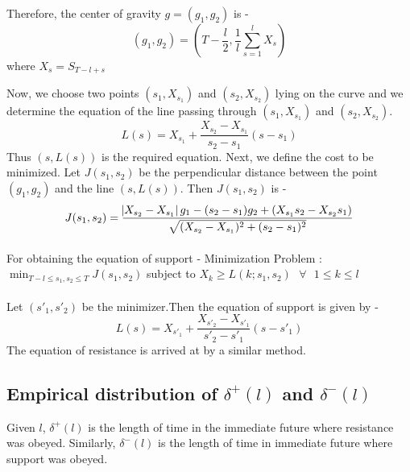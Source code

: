 \documentclass[a4paper]{article}
\numberwithin{equation}{subsection}
\begin{document}
Therefore, the center of gravity $g = (g_1, g_2)$ is -
\begin{equation}
(g_1,g_2) = (T - \frac{l}{2}, \frac{1}{l} \sum_{s=1}^{l} X_s)
\end{equation}
where $X_s = S_{T-l+s}$

Now, we choose two points $(s_1, X_{s_1})$ and $(s_2, X_{s_2})$ lying on the curve and we determine the equation of the line passing through $(s_1, X_{s_1})$ and $(s_2, X_{s_2})$.
\begin{equation}
L(s) = X_{s_1} + \frac{X_{s_2} - X_{s_1}}{s_2 - s_1}(s - s_1)
\end{equation}
Thus $(s, L(s))$ is the required equation.
Next, we define the cost to be minimized. Let $J(s_1,s_2)$ be the perpendicular distance between the point $(g_1,g_2)$ and the line $(s, L(s))$. Then $J(s_1,s_2)$ is -
\begin{equation}
J(s_1,s_2) = \frac{\abs{X_{s_2} - X_{s_1}}g_1 - (s_2 - s_1)g_2 +(X_{s_1}s_2 - X_{s_2}s_1)}{\sqrt{(X_{s_2} - X_{s_1})^2 + (s_2 - s_1)^2}}
\end{equation}

\paragraph{}
For obtaining the equation of support -
\newline Minimization Problem : $\min_{T-l\leq s_1, s_2 \leq T} J(s_1,s_2)$ subject to $X_k \geq L(k;s_1,s_2) \text{ } \forall \text{ } 1 \leq k \leq l$ 

\paragraph{}
Let $(s'_1, s'_2)$ be the minimizer.Then the equation of support is given by - 
\begin{equation}
L(s) = X_{s'_1} + \frac{X_{s'_2} - X_{s'_1}}{s'_2 - s'_1}(s - s'_1)
\end{equation}
The equation of resistance is arrived at by a similar method.

\subsection{Empirical distribution of $\delta^+(l)$ and $\delta^-(l)$ }
Given $l$, $ \delta^+ (l)$ is the length of time in the immediate future where resistance was obeyed. Similarly, $\delta^- (l)$ is the length of time in immediate future where support was obeyed.\\
\noindent
\end{document}
